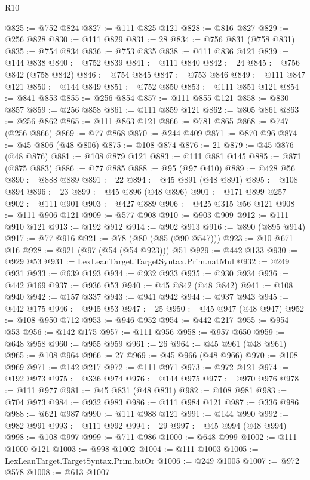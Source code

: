\begin{lexlean}{R10}
\begin{coremodule}
{{{{{{{{{{{{{{{{{{{{{{{{{{{{{{{{{{{{{{{{{{{{{{{{{{{{{{{{{{{{{{{{{{{{{{{{{{{{{{{{{{{{{{{{{{{{{{{{{{{{{{{{{{{{@825 := @752 @824
@827 := @111 @825 @121
@828 := @816 @827
@829 := @256 @828
@830 := @111 @829
@831 := 28
@834 := @756 @831 (@758 @831)
@835 := @754 @834
@836 := @753 @835
@838 := @111 @836 @121
@839 := @144 @838
@840 := @752 @839
@841 := @111 @840
@842 := 24
@845 := @756 @842 (@758 @842)
@846 := @754 @845
@847 := @753 @846
@849 := @111 @847 @121
@850 := @144 @849
@851 := @752 @850
@853 := @111 @851 @121
@854 := @841 @853
@855 := @256 @854
@857 := @111 @855 @121
@858 := @830 @857
@859 := @256 @858
@861 := @111 @859 @121
@862 := @805 @861
@863 := @256 @862
@865 := @111 @863 @121
@866 := @781 @865
@868 := @747 (@256 @866)
@869 := @77 @868
@870 := @244 @409
@871 := @870 @96
@874 := @45 @806 (@48 @806)
@875 := @108 @874
@876 := 21
@879 := @45 @876 (@48 @876)
@881 := @108 @879 @121
@883 := @111 @881 @145
@885 := @871 (@875 @883)
@886 := @77 @885
@888 := @95 (@97 @410)
@889 := @428 @56
@890 := @888 @889
@891 := 22
@894 := @45 @891 (@48 @891)
@895 := @108 @894
@896 := 23
@899 := @45 @896 (@48 @896)
@901 := @171 @899 @257
@902 := @111 @901
@903 := @427 @889
@906 := @425 @315 @56 @121
@908 := @111 @906 @121
@909 := @577 @908
@910 := @903 @909
@912 := @111 @910 @121
@913 := @192 @912
@914 := @902 @913
@916 := @890 (@895 @914)
@917 := @77 @916
@921 := @78 (@80 (@85 (@90 @547)))
@923 := @10 @671 @16
@928 := @921 (@97 (@54 (@54 @923))) @51
@929 := @442 @133
@930 := @929 @53
@931 := LexLeanTarget.TargetSyntax.Prim.natMul
@932 := @249 @931
@933 := @639 @193
@934 := @932 @933
@935 := @930 @934
@936 := @442 @169
@937 := @936 @53
@940 := @45 @842 (@48 @842)
@941 := @108 @940
@942 := @157 @337
@943 := @941 @942
@944 := @937 @943
@945 := @442 @175
@946 := @945 @53
@947 := 25
@950 := @45 @947 (@48 @947)
@952 := @108 @950 @712
@953 := @946 @952
@954 := @442 @217
@955 := @954 @53
@956 := @142 @175
@957 := @111 @956
@958 := @957 @650
@959 := @648 @958
@960 := @955 @959
@961 := 26
@964 := @45 @961 (@48 @961)
@965 := @108 @964
@966 := 27
@969 := @45 @966 (@48 @966)
@970 := @108 @969
@971 := @142 @217
@972 := @111 @971
@973 := @972 @121
@974 := @192 @973
@975 := @336 @974
@976 := @144 @975
@977 := @970 @976
@978 := @111 @977
@981 := @45 @831 (@48 @831)
@982 := @108 @981
@983 := @704 @973
@984 := @932 @983
@986 := @111 @984 @121
@987 := @336 @986
@988 := @621 @987
@990 := @111 @988 @121
@991 := @144 @990
@992 := @982 @991
@993 := @111 @992
@994 := 29
@997 := @45 @994 (@48 @994)
@998 := @108 @997
@999 := @711 @986
@1000 := @648 @999
@1002 := @111 @1000 @121
@1003 := @998 @1002
@1004 := @111 @1003
@1005 := LexLeanTarget.TargetSyntax.Prim.bitOr
@1006 := @249 @1005
@1007 := @972 @578
@1008 := @613 @1007
}}}}}}}}}}}}}}}}}}}}}}}}}}}}}}}}}}}}}}}}}}}}}}}}}}}}}}}}}}}}}}}}}}}}}}}}}}}}}}}}}}}}}}}}}}}}}}}}}}}}}}}}}}}}
\end{coremodule}
\end{lexlean}
